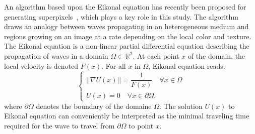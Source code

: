 \documentclass{article}
\begin{document}
            An algorithm based upon the Eikonal equation has recently been proposed for generating superpixels~\cite{figliuzzi2019}, which plays a key role in this study. The algorithm draws an analogy between waves propagating in an heterogeneous medium and regions growing on an image at a rate depending on the local color and texture.
            The Eikonal equation is a non-linear partial differential equation describing the propagation of waves in a domain $\Omega \subset \mathbb{R}^2$. At each point $x$ of the domain, the local velocity is denoted $F(x)$. For all $x$ in $\Omega $, Eikonal equation reads:
            \begin{equation}
              \begin{cases}
                ||\nabla U(x)|| = \dfrac{1}{F(x)} \quad \forall x \in \Omega \\
                U(x) = 0    \quad \forall x \in \partial \Omega,
              \end{cases}
            \end{equation}
            where $\partial \Omega $ denotes the boundary of the domaine $\Omega $. The solution $U(x)$ to Eikonal equation can conveniently be interpreted as the minimal traveling time required for the wave to travel from $\partial \Omega$ to point $x$.
\end{document}

